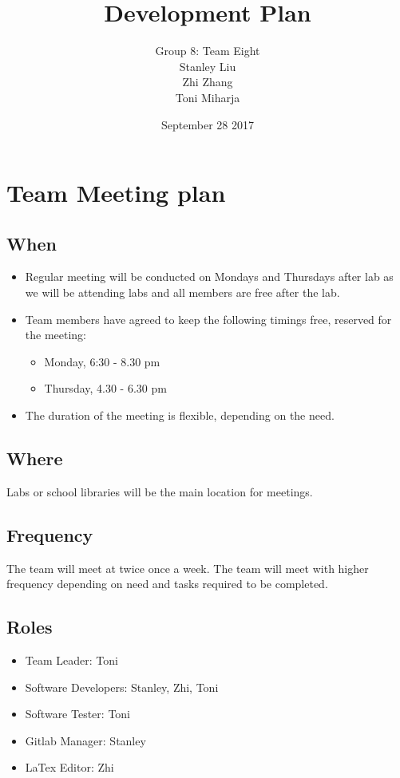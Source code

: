 \documentclass{article}
\title{\textbf{Development Plan}}
\author{Group 8: Team Eight\\
        Stanley Liu\\
        Zhi Zhang\\
        Toni Miharja\\}
\date{September 28 2017}
\begin{document}
\maketitle

\section{Team Meeting plan}
\subsection{When}
\begin{itemize}
    \item Regular meeting will be conducted on Mondays and Thursdays after lab as we will be attending labs and all members are free after the lab.
    \item Team members have agreed to keep the following timings free, reserved for the meeting:
    \begin{itemize}
        \item Monday, 6:30 - 8.30 pm
        \item Thursday, 4.30 - 6.30 pm
    \end{itemize}
    \item The duration of the meeting is flexible, depending on the need.
\end{itemize}

\subsection{Where}
Labs or school libraries will be the main location for meetings.

\subsection{Frequency}
The team will meet at twice once a week. The team will meet with higher frequency depending on need and tasks required to be completed.

\subsection{Roles}
\begin{itemize}
    \item Team Leader: Toni
    \item Software Developers: Stanley, Zhi, Toni
    \item Software Tester: Toni
    \item Gitlab Manager: Stanley
    \item LaTex Editor: Zhi
\end{itemize}
\end{document}
